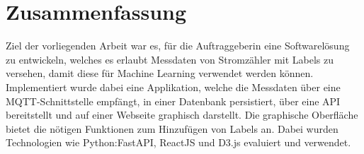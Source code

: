 \begingroup
\let\clearpage\relax
\let\cleardoublepage\relax
\let\cleardoublepage\relax

\cleardoublepage


\chapter*{Zusammenfassung}
Ziel der vorliegenden Arbeit war es, für die Auftraggeberin eine Softwarelösung zu entwickeln, welches es erlaubt
Messdaten von Stromzähler mit Labels zu versehen, damit diese für Machine Learning verwendet werden können.
Implementiert wurde dabei eine Applikation, welche die Messdaten über eine MQTT-Schnittstelle empfängt,
in einer Datenbank persistiert,
über eine API bereitstellt und
auf einer Webseite graphisch darstellt.
Die graphische Oberfläche bietet die nötigen Funktionen zum Hinzufügen von Labels an.
Dabei wurden Technologien wie Python:FastAPI, ReactJS und D3.js evaluiert und verwendet.


\endgroup

\vfill
